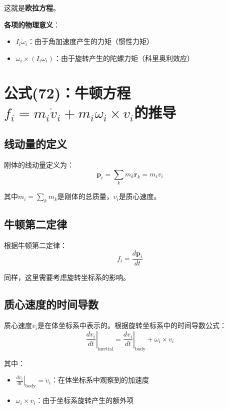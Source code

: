 \documentclass[12pt,a4paper]{article}
\begin{document}
这就是\textbf{欧拉方程}。

\textbf{各项的物理意义}：
\begin{itemize}
\item $I_i \dot{\omega}_i$：由于角加速度产生的力矩（惯性力矩）
\item $\omega_i \times (I_i \omega_i)$：由于旋转产生的陀螺力矩（科里奥利效应）
\end{itemize}

\section{公式(72)：牛顿方程$f_i = m_i \dot{v}_i + m_i \omega_i \times v_i$的推导}

\subsection{线动量的定义}

刚体的线动量定义为：
\begin{equation}
\bm{p}_i = \sum_k m_k \dot{\bm{r}}_k = m_i v_i
\label{eq:linear_momentum}
\end{equation}

其中$m_i = \sum_k m_k$是刚体的总质量，$v_i$是质心速度。

\subsection{牛顿第二定律}

根据牛顿第二定律：
\begin{equation}
f_i = \frac{d\bm{p}_i}{dt}
\label{eq:newton_second_law}
\end{equation}

同样，这里需要考虑旋转坐标系的影响。

\subsection{质心速度的时间导数}

质心速度$v_i$是在体坐标系中表示的。根据旋转坐标系中的时间导数公式：
\begin{equation}
\left.\frac{dv_i}{dt}\right|_{\text{inertial}} = \left.\frac{dv_i}{dt}\right|_{\text{body}} + \omega_i \times v_i
\label{eq:velocity_derivative}
\end{equation}

其中：
\begin{itemize}
\item $\left.\frac{dv_i}{dt}\right|_{\text{body}} = \dot{v}_i$：在体坐标系中观察到的加速度
\item $\omega_i \times v_i$：由于坐标系旋转产生的额外项
\end{itemize}
\end{document}
